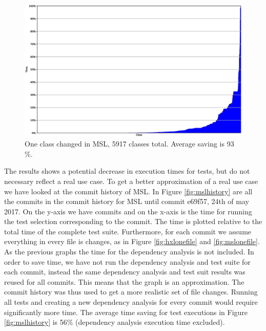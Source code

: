 \documentclass{cslthse-msc}
\begin{document}
\begin{figure}[!htbp]
    \centering
    \includegraphics[width=\textwidth]{Graphs/MSL_one_model.eps}
    \caption{One class changed in MSL, 5917 classes total. Average saving is 93 \%. }
    \label{fig:mslonemodel}
\end{figure}

The results shows a potential decrease in execution times for tests, but do not necessary reflect a real use case. To get a better approximation of a real use case we have looked at the commit history of MSL. In Figure \ref{fig:mslhistory} are all the commits in the commit history for MSL until commit e69f57, 24th of may 2017. On the y-axis we have commits and on the x-axis is the time for running the test selection corresponding to the commit. The time is plotted relative to the total time of the complete test suite. Furthermore, for each commit we assume everything in every file is changes, as in Figure \ref{fig:hxlonefile} and \ref{fig:mslonefile}. As the previous graphs the time for the dependency analysis is not included. In order to save time, we have not run the dependency analysis and test suite for each commit, instead the same dependency analysis and test suit results was reused for all commits. This means that the graph is an approximation. The commit history was thus used to get a more realistic set of file changes. Running all tests and creating a new dependency analysis for every commit would require significantly more time. The average time saving for test executions in Figure \ref{fig:mslhistory} is 56\% (dependency analysis execution time excluded).
\end{document}
